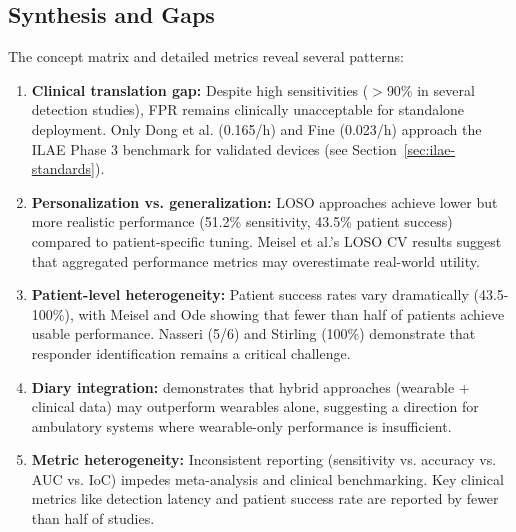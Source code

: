 \subsection{Synthesis and Gaps}

The concept matrix and detailed metrics reveal several patterns:

\begin{enumerate}
  \item \textbf{Clinical translation gap:} Despite high sensitivities ($>$90\% in several detection studies), FPR remains clinically unacceptable for standalone deployment. Only Dong et al. (0.165/h) and Fine (0.023/h) approach the ILAE Phase 3 benchmark for validated devices (see Section~\ref{sec:ilae-standards}).

  \item \textbf{Personalization vs. generalization:} LOSO approaches achieve lower but more realistic performance (51.2\% sensitivity, 43.5\% patient success) compared to patient-specific tuning. Meisel et al.'s LOSO CV results suggest that aggregated performance metrics may overestimate real-world utility.

  \item \textbf{Patient-level heterogeneity:} Patient success rates vary dramatically (43.5-100\%), with Meisel and Ode showing that fewer than half of patients achieve usable performance. Nasseri (5/6) and Stirling (100\%) demonstrate that responder identification remains a critical challenge.

  \item \textbf{Diary integration:} \parencite{vielufSeizureMonitoringCombined2025} demonstrates that hybrid approaches (wearable + clinical data) may outperform wearables alone, suggesting a direction for ambulatory systems where wearable-only performance is insufficient.

  \item \textbf{Metric heterogeneity:} Inconsistent reporting (sensitivity vs. accuracy vs. AUC vs. IoC) impedes meta-analysis and clinical benchmarking. Key clinical metrics like detection latency and patient success rate are reported by fewer than half of studies.
\end{enumerate}
